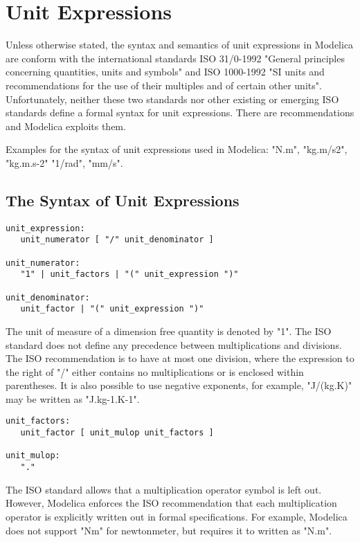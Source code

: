 \chapter{Unit Expressions}

Unless otherwise stated, the syntax and semantics of unit expressions in
Modelica are conform with the international standards ISO 31/0-1992
"General principles concerning quantities, units and symbols" and ISO
1000-1992 "SI units and recommendations for the use of their multiples
and of certain other units". Unfortunately, neither these two standards
nor other existing or emerging ISO standards define a formal syntax for
unit expressions. There are recommendations and Modelica exploits them.

Examples for the syntax of unit expressions used in Modelica: "N.m",
"kg.m/s2", "kg.m.s-2" "1/rad", "mm/s".

\section{The Syntax of Unit Expressions}
\begin{lstlisting}[language=grammar]
unit_expression:
   unit_numerator [ "/" unit_denominator ]
   
unit_numerator:
   "1" | unit_factors | "(" unit_expression ")"
   
unit_denominator:
   unit_factor | "(" unit_expression ")"
\end{lstlisting}

The unit of measure of a dimension free quantity is denoted by "1". The
ISO standard does not define any precedence between multiplications and
divisions. The ISO recommendation is to have at most one division, where
the expression to the right of "/" either contains no multiplications or
is enclosed within parentheses. It is also possible to use negative
exponents, for example, "J/(kg.K)" may be written as "J.kg-1.K-1".

\begin{lstlisting}[language=grammar]
unit_factors:
   unit_factor [ unit_mulop unit_factors ]

unit_mulop:
   "."
\end{lstlisting}

The ISO standard allows that a multiplication operator symbol is left
out. However, Modelica enforces the ISO recommendation that each
multiplication operator is explicitly written out in formal
specifications. For example, Modelica does not support "Nm" for
newtonmeter, but requires it to written as "N.m".

